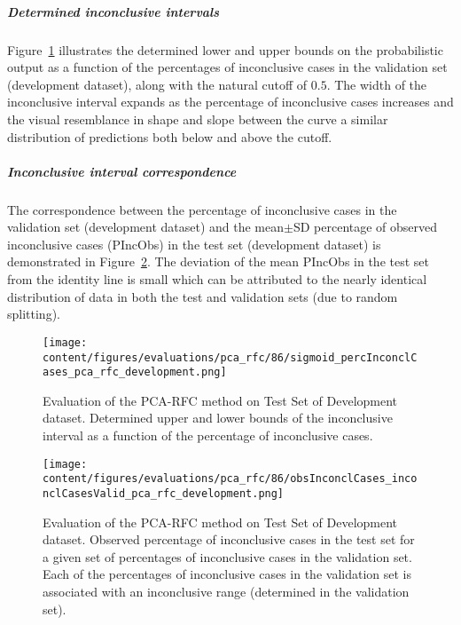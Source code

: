 \subparagraph{Determined inconclusive intervals}

Figure~\ref{fig:pca_rfc_percInconclCases_development} illustrates the determined lower and upper bounds on the 
probabilistic output as a function of the percentages of inconclusive cases in the validation set (development dataset), 
along with the natural cutoff of $0.5$.
The width of the inconclusive interval expands as the percentage of inconclusive cases increases 
and the visual resemblance in shape and slope between the curve a similar distribution of predictions both below and above the cutoff.

\subparagraph{Inconclusive interval correspondence}

The correspondence between the percentage of inconclusive cases in the validation set (development dataset) and 
the mean$\pm$SD percentage of observed inconclusive cases (PIncObs) in the test set (development dataset) 
is demonstrated in Figure~\ref{fig:obsInconclCases_inconclCasesValid_pca_rfc_development}.
The deviation of the mean PIncObs in the test set from the 
identity line is small which can be attributed to the nearly identical distribution of data in both the test and validation sets 
(due to random splitting).


\begin{figure}[ht]
  \centering
  \texttt{[image: content/figures/evaluations/pca\_rfc/86/sigmoid\_percInconclCases\_pca\_rfc\_development.png]}
  \caption{Evaluation of the PCA-RFC method on Test Set of Development dataset. 
  Determined upper and lower bounds of the inconclusive interval as a function of the percentage of inconclusive cases.} 
  \label{fig:pca_rfc_percInconclCases_development}
\end{figure}


\begin{figure}[ht]
  \centering
  \texttt{[image: content/figures/evaluations/pca\_rfc/86/obsInconclCases\_inconclCasesValid\_pca\_rfc\_development.png]}
  \caption{Evaluation of the PCA-RFC method on Test Set of Development dataset.
  Observed percentage of inconclusive cases in the test set 
  for a given set of percentages of inconclusive cases in the validation set.
  Each of the percentages of inconclusive cases in the validation set is associated 
  with an inconclusive range (determined in the validation set).} 
  \label{fig:obsInconclCases_inconclCasesValid_pca_rfc_development}
\end{figure} 


